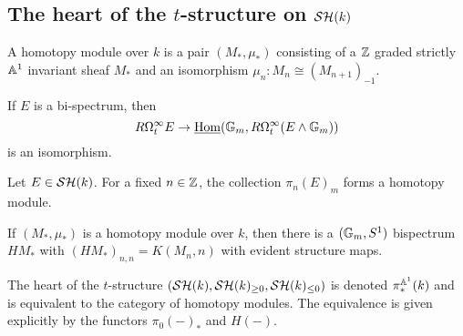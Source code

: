 \documentclass{amsart}%
\begin{document}
\subsection{The heart of the $t$-structure on $\mathcal{SH}(k)$}

\begin{definition}
  A homotopy module over $k$ is a pair $(M_*, \mu_*)$ consisting of a
  $\mathbb{Z}$ graded strictly $\mathbb{A}^1$ invariant sheaf $M_*$ and an
  isomorphism $\mu_n : M_n \cong (M_{n+1})_{-1}$. 
\end{definition}

\begin{lemma}
  If $E$ is a bi-spectrum, then 
  \begin{equation*}
    R\Omega^{\infty}_t E \to \underline{\operatorname{Hom}}(\mathbb{G}_m, R\Omega^{\infty}_t(E\wedge \mathbb{G}_m))
  \end{equation*}
  is an isomorphism.
\end{lemma}

\begin{lemma}
  Let $E \in \mathcal{SH}(k)$. For a fixed $n\in\mathbb{Z}$, the collection
  $\pi_{n}(E)_{m}$ forms a homotopy module.
\end{lemma}

\begin{lemma}
  If $(M_*, \mu_*)$ is a homotopy module over $k$, then there is a
  $(\mathbb{G}_m, S^1)$ bispectrum $HM_*$ with $(HM_*)_{n,n} = K(M_n,n)$
  with evident structure maps. 
\end{lemma}

\begin{theorem}
  The heart of the $t$-structure
  $(\mathcal{SH}(k), \mathcal{SH}(k)_{\geq 0}, \mathcal{SH}(k)_{\leq 0})$ is denoted
  $\pi^{\mathbb{A}^1}_*(k)$ and is equivalent to the category of homotopy
  modules. The equivalence is given explicitly by the functors
  $\pi_0(-)_*$ and $H(-)$. 
\end{theorem}
\end{document}
